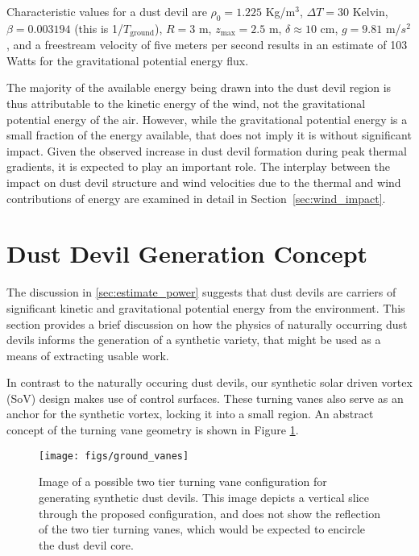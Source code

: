 Characteristic values for a dust devil are $\rho_0 = 1.225$ Kg/$\text{m}^3$, 
$\Delta T= 30$ Kelvin, $\beta = 0.003194$ (this is 1/$T_{\text{ground}}$), 
$R = 3 $ m, $z_\text{max} = 2.5$ m, $\delta \approx 10$ cm, $g=9.81$ m/$s^2$, and a
freestream velocity of five meters per second results in an estimate of
103 Watts for the gravitational potential energy flux. 

The majority of the available energy being drawn into the dust devil
region is thus attributable to the kinetic energy of the wind, not the
gravitational potential energy of the air.
However, while the gravitational potential energy is a small fraction of
the energy available, that does not imply it is without significant
impact. 
Given the observed increase in dust devil formation during peak thermal
gradients, it is expected to play an important role. The interplay
between the impact on dust devil structure and wind velocities due to
the thermal and wind contributions of energy are examined in detail in
Section~\ref{sec:wind_impact}. 

\section{Dust Devil Generation Concept}
\label{sec:dust_devil_concept}

The discussion in \ref{sec:estimate_power} suggests that dust devils are
carriers of significant kinetic and gravitational
potential energy from the environment. This section provides a brief
discussion on how the physics of naturally occurring dust devils informs
the generation of a synthetic variety, that might be used as a means of
extracting usable work.    

In contrast to the naturally occuring dust devils,
our synthetic solar driven vortex (SoV) design makes use of
control surfaces. These turning vanes also serve as an anchor for the
synthetic vortex, locking it into a small region. An abstract concept of
the turning vane geometry is shown in Figure \ref{fig:cartoon_vanes}.

  \begin{figure}[!htb]
    \begin{center}
     \texttt{[image: figs/ground\_vanes]}
     \caption{Image of a possible two tier turning vane 
       configuration for generating synthetic dust devils. This image depicts a 
       vertical slice through the proposed configuration, and does not show the reflection 
       of the two tier turning vanes, which would be expected to encircle the dust devil core.}
     \label{fig:cartoon_vanes}
    \end{center}
  \end{figure}

